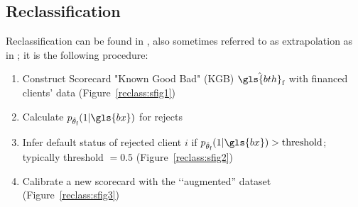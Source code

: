\subsection{Reclassification} \label{reclassification}

Reclassification can be found in \cite{RI6}, also sometimes referred to as extrapolation as in \cite{banasik}; it is the following procedure:
\begin{enumerate}
\item Construct Scorecard "Known Good Bad" (KGB) $\hat{\gls{bth}}_{\text{f}}$ with financed clients' data (Figure~\ref{reclass:sfig1})
\item Calculate $p_{\hat{\theta}_{\text{f}}}(1|\gls{bx})$ for rejects
\item Infer default status of rejected client $i$ if $p_{\hat{\theta}_{\text{f}}}(1|\gls{bx}) > \text{threshold}$; typically threshold $=0.5$ (Figure~\ref{reclass:sfig2})
\item Calibrate a new scorecard with the ‘‘augmented'' dataset (Figure~\ref{reclass:sfig3})
\end{enumerate}

